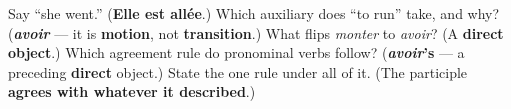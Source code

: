 \begin{tcolorbox}[breakable,colback=teal!4,colframe=teal!35!black,title={Before you move on}]
Say \textquotedblleft{}she went.\textquotedblright{} (\textbf{Elle est allée}.) Which auxiliary does \textquotedblleft{}to run\textquotedblright{} take, and why? (\emph{\textbf{avoir}} — it is \textbf{motion}, not \textbf{transition}.) What flips \emph{monter} to \emph{avoir}? (A \textbf{direct object}.) Which agreement rule do pronominal verbs follow? (\textbf{\emph{avoir}'s} — a preceding \textbf{direct} object.) State the one rule under all of it. (The participle \textbf{agrees with whatever it described}.)
\end{tcolorbox}
